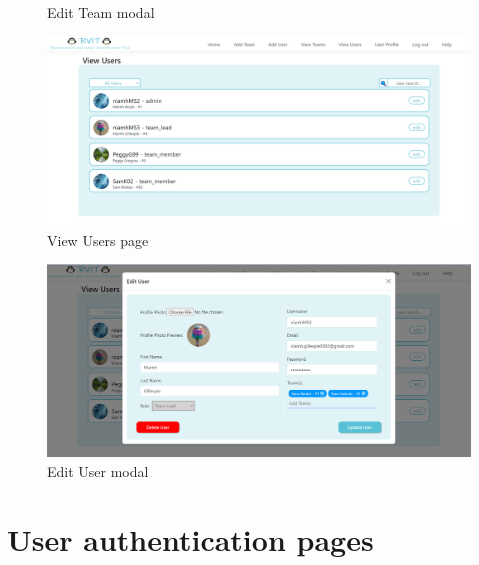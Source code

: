 \documentclass{l4proj}
\begin{document}
\begin{appendices}
\begin{figure}[h!]
\caption{Edit Team modal}
\label{fig: edit team modal}
\end{figure}
\hfill
\begin{figure}[h!]
\centering
\includegraphics[scale=0.4]{dissertation/images/viewuser.png}
\caption{View Users page}
\label{fig: view user page}
\end{figure}
\hfill\begin{figure}[h!]
\centering
\includegraphics[scale=0.4]{dissertation/images/edituser.png}
\caption{Edit User modal}
\label{fig: edit user page}
\end{figure}




\chapter{User authentication pages}
\label{app: user authentication workflow}


\end{appendices}
\end{document}
